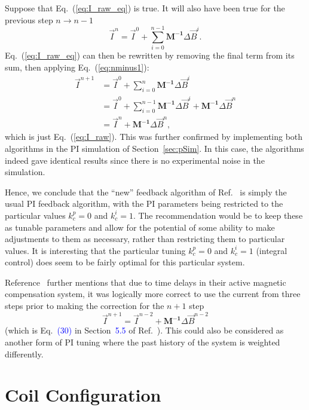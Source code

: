 Suppose that Eq.~(\ref{eq:I_raw_eq}) is true.  It will also have been
true for the previous step $n\rightarrow n-1$
\begin{equation}\label{eq:nminus1}
    \vec{I}^{n}= \vec{I}^{0}+\sum_{i=0}^{n-1} \bm{M^{-1}}\Delta \vec{B}^{i}.
\end{equation}
Eq.~(\ref{eq:I_raw_eq}) can then be rewritten by removing the final
term from its sum, then applying Eq.~(\ref{eq:nminus1}):
\begin{equation}
\begin{split}
\vec{I}^{n+1}&=\vec{I}^{0}+\sum_{i=0}^n \bm{M^{-1}}\Delta \vec{B}^{i}\\
&=\vec{I}^{0}+\sum_{i=0}^{n-1}\bm{M^{-1}}\Delta \vec{B}^{i}+ \bm{M^{-1}}\Delta  \vec{B}^{n}\\
&=\vec{I}^{n}+ \bm{M^{-1}}\Delta \vec{B}^{n},
\end{split}
\end{equation}
which is just Eq.~(\ref{eq:I_raw}).  This was further confirmed by
implementing both algorithms in the PI simulation of
Section~\ref{sec:pSim}.  In this case, the algorithms indeed gave
identical results since there is no experimental noise in the
simulation.

Hence, we conclude that the ``new'' feedback algorithm of
Ref.~\cite{rawlik} is simply the usual PI feedback algorithm, with the
PI parameters being restricted to the particular values $k_c^p=0$ and
$k_c^i=1$. The recommendation would be to keep these as tunable
parameters and allow for the potential of some ability to make
adjustments to them as necessary, rather than restricting them
to particular values. It is interesting that the particular tuning
$k_c^p=0$ and $k_c^i=1$ (integral control) does seem to be fairly optimal
for this particular system.

Reference~\cite{rawlik} further mentions that due to time delays in
their active magnetic compensation system, it was logically more
correct to use the current from three steps prior to making the
correction for the $n+1$ step
\begin{equation}\label{eq:I_raw_delay}
    \vec{I}^{n+1}= \vec{I}^{n-2}+\bm{M^{-1}} \Delta \vec{B}^{n-2}
\end{equation}
(which is Eq.~\textcolor{blue}{(30)} in Section~\textcolor{blue}{5.5} of
Ref.~\cite{rawlik}).  This could also be
considered as another form of PI tuning where the past history of the
system is weighted differently.


\section{Coil Configuration}\label{sec:coil_config}


